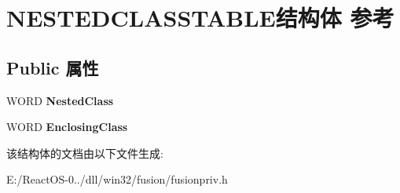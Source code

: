 \hypertarget{struct_n_e_s_t_e_d_c_l_a_s_s_t_a_b_l_e}{}\section{N\+E\+S\+T\+E\+D\+C\+L\+A\+S\+S\+T\+A\+B\+L\+E结构体 参考}
\label{struct_n_e_s_t_e_d_c_l_a_s_s_t_a_b_l_e}
\subsection*{Public 属性}
\begin{DoxyCompactItemize}
\item 
\mbox{\label{struct_n_e_s_t_e_d_c_l_a_s_s_t_a_b_l_e_a4a85a8b21c41aa8039146356abfb58ca}} 
W\+O\+RD {\bfseries Nested\+Class}
\item 
\mbox{\label{struct_n_e_s_t_e_d_c_l_a_s_s_t_a_b_l_e_a67060b02c74c6ae34983d8a2782d187b}} 
W\+O\+RD {\bfseries Enclosing\+Class}
\end{DoxyCompactItemize}


该结构体的文档由以下文件生成\+:\begin{DoxyCompactItemize}
\item 
E\+:/\+React\+O\+S-\/0../dll/win32/fusion/fusionpriv.\+h\end{DoxyCompactItemize}
